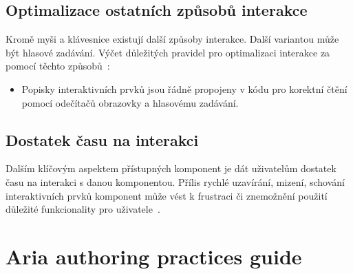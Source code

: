 \subsection{Optimalizace ostatních způsobů interakce}


Kromě myši a klávesnice existují další způsoby interakce.
Další variantou může být hlasové zadávání.
Výčet důležitých pravidel pro optimalizaci interakce za pomocí těchto způsobů~\cite{w3-accessibility-principles}:

\begin{itemize}
    \item Popisky interaktivních prvků jsou řádně propojeny v kódu pro korektní čtění pomocí odečítačů obrazovky a hlasovému zadávání.
\end{itemize}

\subsection{Dostatek času na interakci}

Dalším klíčovým aspektem přístupných komponent je dát uživatelům dostatek času na interakci s danou komponentou.
Přílis rychlé uzavírání, mizení, schování interaktivních prvků komponent může vést k frustraci či znemožnění použití důležité funkcionality pro uživatele~\cite{w3-accessibility-principles}.

\section{Aria authoring practices guide}

